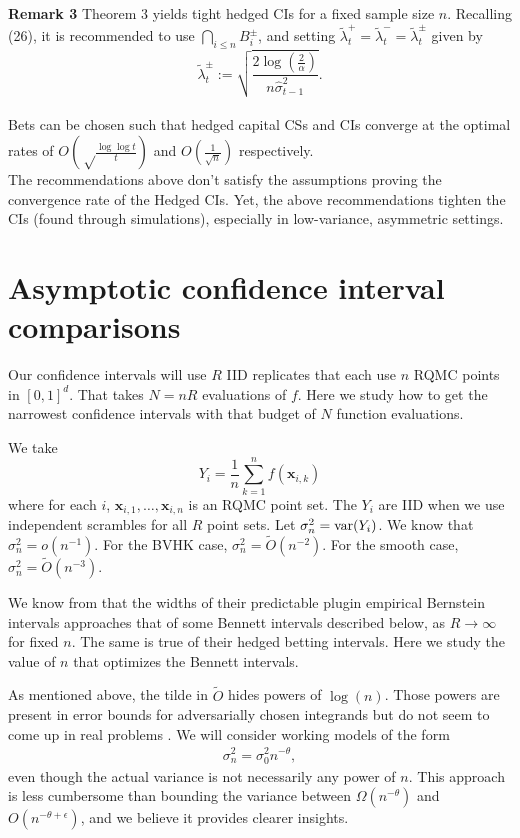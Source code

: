 \documentclass{article}
\newcommand{\art}[1]{\begingroup\color{blue}#1\endgroup}
\renewcommand{\leq}{\leqslant}
\newcommand{\bsx}{\boldsymbol{x}}
\begin{document}
{\noindent \textbf{Remark 3} \quad Theorem 3 yields tight hedged CIs for a fixed sample size \( n \). Recalling (26), it is recommended to use \( \bigcap_{i \leq n} B^\pm_i \), and setting \( \tilde{\lambda}^+_t = \tilde{\lambda}^-_t = \tilde{\lambda}^\pm_t \) given by
\begin{equation} \label{eq:27}
    \tilde{\lambda}^\pm_t := \sqrt{\frac{2 \log( \frac{2}{\alpha})}{n \hat{\sigma}^2_{t-1}}}.
\end{equation}
\\

\noindent Bets can be chosen such that hedged capital CSs and CIs converge at the optimal rates of \( O \left( \sqrt\frac{\log \log t}{t} \right) \) and \( O \left( \frac{1}{\sqrt{n}} \right) \) respectively. \\ 

\noindent The recommendations above don't satisfy the assumptions proving the convergence rate of the Hedged CIs. Yet, the above recommendations tighten the CIs (found through simulations), especially in low-variance, asymmetric settings. }
\section{Asymptotic confidence interval comparisons}\label{sec:asymptotic}

Our confidence intervals will use $R$ IID replicates that each
use $n$ RQMC points in $[0,1]^d$.  That takes $N=nR$
evaluations of $f$. 
Here we study how to get the narrowest confidence
intervals with that budget of $N$ function evaluations.

We take 
$$Y_i=\frac1n\sum_{k=1}^nf(\bsx_{i,k})$$
where for each $i$, $\bsx_{i,1},\dots,\bsx_{i,n}$ is an RQMC
point set. The $Y_i$ are IID when we use independent
scrambles for all $R$ point sets. Let $\sigma^2_n = \operatorname{var}(Y_i)$.
We know that $\sigma^2_n = o(n^{-1}).$
For the BVHK case, $\sigma^2_n=\tilde O(n^{-2})$.  
For the smooth case,
$\sigma^2_n=\tilde O(n^{-3})$.  

\art{We know from \cite{WauRam24a} that the widths of their
predictable plugin empirical Bernstein intervals approaches
that of some Bennett intervals described below, as $R\to\infty$
for fixed $n$.
The same is true of their hedged betting intervals. Here we
study the value of $n$ that optimizes the Bennett intervals.}



As mentioned above, the tilde in $\tilde O$ hides powers of $\log(n)$.
Those powers are present in error bounds for adversarially
chosen integrands but do not seem to come up in
real problems \cite{schl:2002,wherearethelogs}.
We will consider working models of the form
\begin{align}\label{eq:themodel}
\sigma^2_n = \sigma^2_0n^{-\theta},
\end{align}
 even though the actual variance is not
necessarily any power of $n$. This approach is
\art{less cumbersome than bounding the variance between
$\Omega(n^{-\theta})$ and $O(n^{-\theta+\epsilon})$,
and we believe it provides clearer insights.}
\end{document}
